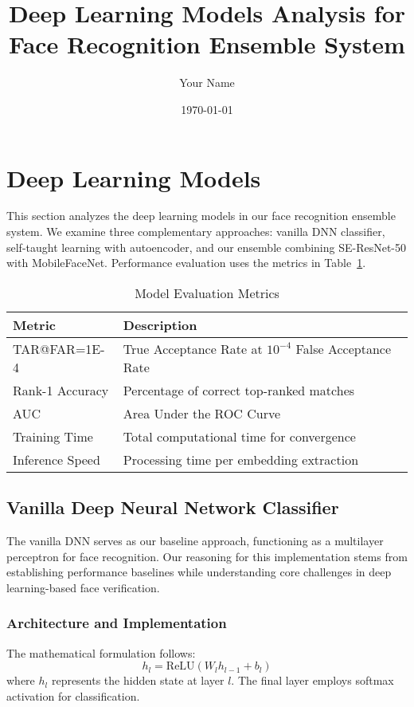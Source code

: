 \documentclass[11pt]{article}
\title{Deep Learning Models Analysis for Face Recognition Ensemble System}
\author{Your Name}
\date{\today}
\begin{document}
\maketitle

\section{Deep Learning Models}

This section analyzes the deep learning models in our face recognition ensemble system. We examine three complementary approaches: vanilla DNN classifier, self-taught learning with autoencoder, and our ensemble combining SE-ResNet-50 with MobileFaceNet. Performance evaluation uses the metrics in Table~\ref{tab:metrics}.

\begin{table}[htbp]
\centering
\caption{Model Evaluation Metrics}
\label{tab:metrics}
\begin{tabular}{@{}ll@{}}
\toprule
\textbf{Metric} & \textbf{Description} \\
\midrule
TAR@FAR=1E-4 & True Acceptance Rate at $10^{-4}$ False Acceptance Rate \\
Rank-1 Accuracy & Percentage of correct top-ranked matches \\
AUC & Area Under the ROC Curve \\
Training Time & Total computational time for convergence \\
Inference Speed & Processing time per embedding extraction \\
\bottomrule
\end{tabular}
\end{table}

\subsection{Vanilla Deep Neural Network Classifier}

The vanilla DNN serves as our baseline approach, functioning as a multilayer perceptron for face recognition. Our reasoning for this implementation stems from establishing performance baselines while understanding core challenges in deep learning-based face verification.

\subsubsection{Architecture and Implementation}

The mathematical formulation follows:
\begin{equation}
h_l = \text{ReLU}(W_l h_{l-1} + b_l)
\end{equation}
where $h_l$ represents the hidden state at layer $l$. The final layer employs softmax activation for classification.
\end{document}
